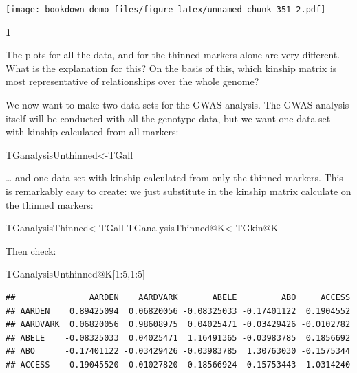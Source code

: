 \documentclass[
]{book}
\makeatletter
\newenvironment{Shaded}{\begin{snugshade}}{\end{snugshade}}
\newcommand{\DecValTok}[1]{\textcolor[rgb]{0.00,0.00,0.81}{#1}}
\newcommand{\NormalTok}[1]{#1}
\newcommand{\OtherTok}[1]{\textcolor[rgb]{0.56,0.35,0.01}{#1}}
\newcommand{\SpecialCharTok}[1]{\textcolor[rgb]{0.00,0.00,0.00}{#1}}
\newenvironment{kframe}{%
\medskip{}
\setlength{\fboxsep}{.8em}
 \def\at@end@of@kframe{}%
 \ifinner\ifhmode%
  \def\at@end@of@kframe{\end{minipage}}%
  \begin{minipage}{\columnwidth}%
 \fi\fi%
 \def\FrameCommand##1{\hskip\@totalleftmargin \hskip-\fboxsep
 \colorbox{shadecolor}{##1}\hskip-\fboxsep
     \hskip-\linewidth \hskip-\@totalleftmargin \hskip\columnwidth}%
 \MakeFramed {\advance\hsize-\width
   \@totalleftmargin\z@ \linewidth\hsize
   \@setminipage}}%
 {\par\unskip\endMakeFramed%
 \at@end@of@kframe}
\newenvironment{rmdblock}[1]
  {
  \begin{itemize}
  \renewcommand{\labelitemi}{
    \raisebox{-.7\height}[0pt][0pt]{
      {\setkeys{Gin}{width=3em,keepaspectratio}\texttt{[image: images/\#1]}}
    }
  }
  \setlength{\fboxsep}{1em}
  \begin{kframe}
  \item
  }
  {
  \end{kframe}
  \end{itemize}
  }
\newenvironment{rmdquiz}
  {\begin{rmdblock}{quiz}}
  {\end{rmdblock}}
\makeatother
\begin{document}
\texttt{[image: bookdown-demo\_files/figure-latex/unnamed-chunk-351-2.pdf]}

\begin{rmdquiz}
\textbf{1}

The plots for all the data, and for the thinned markers alone are very different. What is the explanation for this? On the basis of this, which kinship matrix is most representative of relationships over the whole genome?
\end{rmdquiz}

We now want to make two data sets for the GWAS analysis. The GWAS analysis itself will be conducted with all the genotype data, but we want one data set with kinship calculated from all markers:

\begin{Shaded}
\begin{Highlighting}[]
\NormalTok{TGanalysisUnthinned}\OtherTok{\textless{}{-}}\NormalTok{TGall }
\end{Highlighting}
\end{Shaded}

\ldots{} and one data set with kinship calculated from only the thinned markers. This is remarkably easy to create: we just substitute in the kinship matrix calculate on the thinned markers:

\begin{Shaded}
\begin{Highlighting}[]
\NormalTok{TGanalysisThinned}\OtherTok{\textless{}{-}}\NormalTok{TGall}
\NormalTok{TGanalysisThinned}\SpecialCharTok{@}\NormalTok{K}\OtherTok{\textless{}{-}}\NormalTok{TGkin}\SpecialCharTok{@}\NormalTok{K }
\end{Highlighting}
\end{Shaded}

Then check:

\begin{Shaded}
\begin{Highlighting}[]
\NormalTok{TGanalysisUnthinned}\SpecialCharTok{@}\NormalTok{K[}\DecValTok{1}\SpecialCharTok{:}\DecValTok{5}\NormalTok{,}\DecValTok{1}\SpecialCharTok{:}\DecValTok{5}\NormalTok{] }
\end{Highlighting}
\end{Shaded}

\begin{verbatim}
##               AARDEN    AARDVARK       ABELE         ABO     ACCESS
## AARDEN    0.89425094  0.06820056 -0.08325033 -0.17401122  0.1904552
## AARDVARK  0.06820056  0.98608975  0.04025471 -0.03429426 -0.0102782
## ABELE    -0.08325033  0.04025471  1.16491365 -0.03983785  0.1856692
## ABO      -0.17401122 -0.03429426 -0.03983785  1.30763030 -0.1575344
## ACCESS    0.19045520 -0.01027820  0.18566924 -0.15753443  1.0314240
\end{verbatim}
\end{document}
